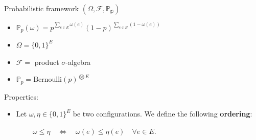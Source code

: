 \documentclass[
  letterpaper,
  DIV=11,
  numbers=noendperiod]{scrartcl}
\providecommand{\tightlist}{%
  \setlength{\itemsep}{0pt}\setlength{\parskip}{0pt}}\usepackage{longtable,booktabs,array}
\begin{document}
Probabilistic framework \((\Omega, \mathcal{F}, \mathbb{P_p})\)

\begin{itemize}
\item
  \(\mathbb{P}_p(\omega) = p^{\sum_{e \in E} \omega(e)} (1 - p)^{\sum_{e \in E} (1 - \omega(e))}\)
\item
  \(\Omega = \{0, 1\}^E\)
\item
  \(\mathcal{F}=\) product \(\sigma\)-algebra
\item
  \(\mathbb{P}_p = \text{Bernoulli}(p)^{\bigotimes E}\)
\end{itemize}

Properties:

\begin{itemize}
\tightlist
\item
  Let \(\omega, \eta \in \{0, 1\}^E\) be two configurations. We define
  the following \textbf{ordering}:
\end{itemize}

\(\qquad \qquad \omega \leq \eta \quad \iff \quad \omega(e) \leq \eta(e) \quad \forall e \in E.\)
\end{document}
